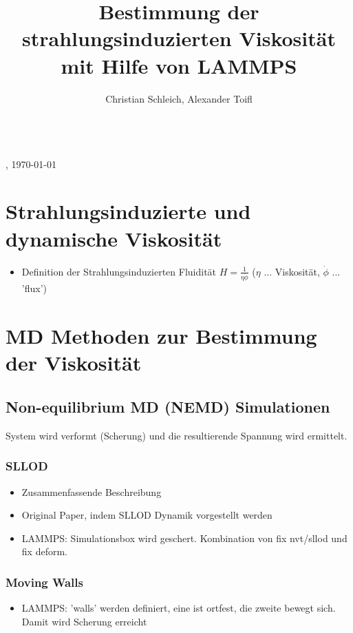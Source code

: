 \documentclass[a4paper, 10pt, 
               numbers=noenddot, toc=graduated,
               headsepline=true, footsepline=true,
               twoside=false, titlepage=true, 
               bibliography=totoc]{scrartcl}
\begin{document}
\title{Bestimmung der strahlungsinduzierten Viskosit{\"a}t mit Hilfe von LAMMPS}
\author{Christian Schleich, Alexander Toifl}

\begin{center}
\huge{\thetitle} \\
\small{\theauthor, \today}
\end{center}

\hspace{1 cm}


\section{Strahlungsinduzierte und dynamische Viskosität}
\begin{itemize}
	 \item Definition der Strahlungsinduzierten Fluidität $H = \frac 1 {\eta \dot{\phi}}$ ($\eta$ ... Viskosität, $\dot{\phi}$ ... 'flux') \cite{Mayr2003}
\end{itemize}


\section{MD Methoden zur Bestimmung der Viskosität}

\subsection{Non-equilibrium MD (NEMD) Simulationen}

System wird verformt (Scherung) und die resultierende Spannung wird ermittelt. 


	\subsubsection{SLLOD}
		\begin{itemize}
		 	\item Zusammenfassende Beschreibung \cite{Tenney2010} 
		 	\item Original Paper, indem SLLOD Dynamik vorgestellt werden \cite{Evans1984}
		 	\item LAMMPS: Simulationsbox wird geschert. Kombination von fix nvt/sllod und fix deform.
		\end{itemize}
		
	\subsubsection{Moving Walls}
	    \begin{itemize}
		 	\item LAMMPS: 'walls' werden definiert, eine ist ortfest, die zweite bewegt sich. Damit wird Scherung erreicht
		\end{itemize}
\end{document}
